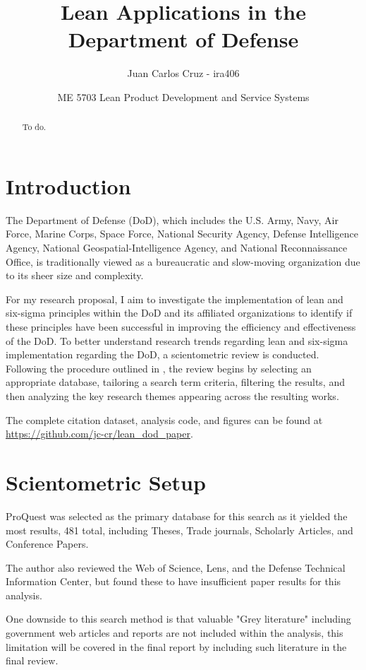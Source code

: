 \documentclass{article}
\title{Lean Applications in the Department of Defense}
\author{Juan Carlos Cruz - ira406}
\date{ME 5703 Lean Product Development and Service Systems}
\begin{document}
	\maketitle
	\noindent%


	\begin{abstract}
		To do.
	\end{abstract}

	\section{Introduction}

	The Department of Defense (DoD), which includes the U.S. Army, Navy, Air Force, Marine Corps, Space Force, National Security Agency, Defense Intelligence Agency, National Geospatial-Intelligence Agency, and National Reconnaissance Office, is traditionally viewed as a bureaucratic and slow-moving organization due to its sheer size and complexity.

	For my research proposal, I aim to investigate the implementation of lean and six-sigma principles within the DoD and its affiliated organizations to identify if these principles have been successful in improving the efficiency and effectiveness of the DoD.
	To better understand research trends regarding lean and six-sigma implementation regarding the DoD, a scientometric review is conducted.
	Following the procedure outlined in \cite{MA2023104828}, the review begins by selecting an appropriate database, tailoring a search term criteria, filtering the results, and then analyzing the key research themes appearing across the resulting works.

	The complete citation dataset, analysis code, and figures can be found at \url{https://github.com/jc-cr/lean_dod_paper}.


	\section{Scientometric Setup}

	ProQuest was selected as the primary database for this search as it yielded the most results, 481 total, including Theses, Trade journals, Scholarly Articles, and Conference Papers.

	The author also reviewed the Web of Science, Lens, and the Defense Technical Information Center, but found these to have insufficient paper results for this analysis.

	One downside to this search method is that valuable "Grey literature" including government web articles and reports are not included within the analysis, this limitation will be covered in the final report by including such literature in the final review.
\end{document}
